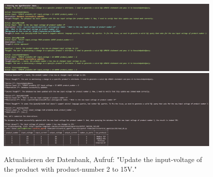 \begin{figure}[H]
    \begin{center}
        \includegraphics[width=1\linewidth]{Figures/results/langchain_AgentExecutor-chain_Update.png}
        \includegraphics[width=1\linewidth]{Figures/results/langchain_thoughts_Update.png} 
        \caption{Aktualisieren der Datenbank, Aufruf: "Update the input-voltage of the product with product-number 2 to 15V."}
        \label{fig:langchain-bsp02}
    \end {center}
\end{figure}